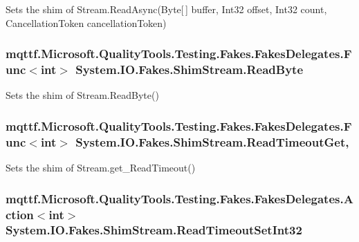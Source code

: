 Sets the shim of Stream.\-Read\-Async(\-Byte\mbox{[}$\,$\mbox{]} buffer, Int32 offset, Int32 count, Cancellation\-Token cancellation\-Token)

\hypertarget{class_system_1_1_i_o_1_1_fakes_1_1_shim_stream_accf0a9f7eb0fc443ffe11f6767d12d09}{
\subsubsection[{Read\-Byte}]{\setlength{\rightskip}{0pt plus 5cm}mqttf.\-Microsoft.\-Quality\-Tools.\-Testing.\-Fakes.\-Fakes\-Delegates.\-Func$<$int$>$ System.\-I\-O.\-Fakes.\-Shim\-Stream.\-Read\-Byte\hspace{0.3cm}{\ttfamily [set]}}}\label{class_system_1_1_i_o_1_1_fakes_1_1_shim_stream_accf0a9f7eb0fc443ffe11f6767d12d09}


Sets the shim of Stream.\-Read\-Byte()

\hypertarget{class_system_1_1_i_o_1_1_fakes_1_1_shim_stream_a44d622075e1cc45601f5f6b186f8943e}{
\subsubsection[{Read\-Timeout\-Get}]{\setlength{\rightskip}{0pt plus 5cm}mqttf.\-Microsoft.\-Quality\-Tools.\-Testing.\-Fakes.\-Fakes\-Delegates.\-Func$<$int$>$ System.\-I\-O.\-Fakes.\-Shim\-Stream.\-Read\-Timeout\-Get\hspace{0.3cm}{\ttfamily [get]}, {\ttfamily [set]}}}\label{class_system_1_1_i_o_1_1_fakes_1_1_shim_stream_a44d622075e1cc45601f5f6b186f8943e}


Sets the shim of Stream.\-get\-\_\-\-Read\-Timeout()

\hypertarget{class_system_1_1_i_o_1_1_fakes_1_1_shim_stream_a3f10ce7d67c1f77260b5efcd05c23964}{
\subsubsection[{Read\-Timeout\-Set\-Int32}]{\setlength{\rightskip}{0pt plus 5cm}mqttf.\-Microsoft.\-Quality\-Tools.\-Testing.\-Fakes.\-Fakes\-Delegates.\-Action$<$int$>$ System.\-I\-O.\-Fakes.\-Shim\-Stream.\-Read\-Timeout\-Set\-Int32\hspace{0.3cm}{\ttfamily [set]}}}\label{class_system_1_1_i_o_1_1_fakes_1_1_shim_stream_a3f10ce7d67c1f77260b5efcd05c23964}



